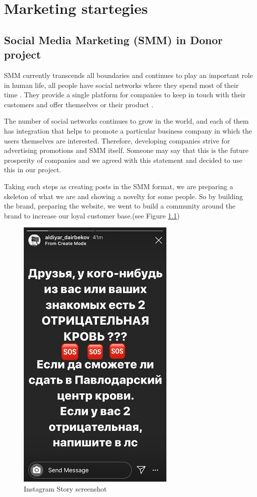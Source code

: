 \chapter{Marketing startegies}\label{ch:B}

\section{Social Media Marketing (SMM) in Donor project}
SMM currently transcends all boundaries and continues to play an important role in human life, all people have social networks where they spend most of their time \cite{macarthy}. They provide a single platform for companies to keep in touch with their customers and offer themselves or their product \cite{macarthy}.
\par
The number of social networks continues to grow in the world, and each of them has integration that helps to promote a particular business company in which the users themselves are interested. Therefore, developing companies strive for advertising promotions and SMM itself. Someone may say that this is the future prosperity of companies and we agreed with this statement and decided to use this in our project.
\par
Taking such steps as creating posts in the SMM format, we are preparing a skeleton of what we are and showing a novelty for some people. So by building the brand, preparing the website, we went to build a community around the brand to increase our loyal customer base.(see Figure \ref{fig:storyscreenshot})
\begin{figure}[h]
    \centering
    \includegraphics[scale=0.7]{figures/6.jpeg}
    \caption{Instagram Story screenshot}
    \label{fig:storyscreenshot}
\end{figure}

